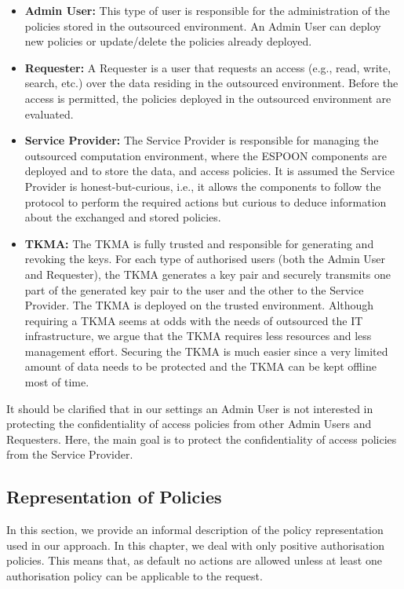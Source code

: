 \documentclass[epsfig,a4paper,11pt,titlepage]{book}
\numberwithin{algorithm}{chapter}
\begin{document}
\begin{itemize}
\item \textbf{Admin User:} This type of user is responsible for the administration of the policies stored in the outsourced environment. An Admin User can deploy new policies or update/delete the policies already deployed.
\item \textbf{Requester:} A Requester is a user that requests an access (e.g., read, write, search, etc.) over the data residing in the outsourced environment. Before the access is permitted, the policies deployed in the outsourced environment are evaluated.

\item \textbf{Service Provider:} The Service Provider is responsible for managing the outsourced computation environment, where the \gls{ESPOON} components are deployed and to store the data, and access policies. It is assumed the Service Provider is honest-but-curious, i.e., it allows the components to follow the protocol to perform the required actions but curious to deduce information about the exchanged and stored policies.

\item \textbf{\gls{TKMA}:} The \gls{TKMA} is fully trusted and responsible for generating and revoking the keys. For each type of authorised users (both the Admin User and Requester), the \gls{TKMA} generates a key pair and securely transmits one part of the generated key pair to the user and the other to the Service Provider. The \gls{TKMA} is deployed on the trusted environment. Although requiring a \gls{TKMA} seems at odds with the needs of outsourced the \gls{IT} infrastructure, we argue that the \gls{TKMA} requires less resources and less management effort. Securing the \gls{TKMA} is much easier since a very limited amount of data needs to be protected and the \gls{TKMA} can be kept offline most of time.
\end{itemize}

It should be clarified that in our settings an Admin User is not interested in protecting the confidentiality of access policies from other Admin Users and Requesters. Here, the main goal is to protect the confidentiality of access policies from the Service Provider.

\subsection{Representation of Policies}
\label{sec:espoon-policy-representation}
In this section, we provide an informal description of the policy representation used in our approach. In this chapter, we deal with only positive authorisation policies. This means that, as default no actions are allowed unless at least one authorisation policy can be applicable to the request.
\end{document}
